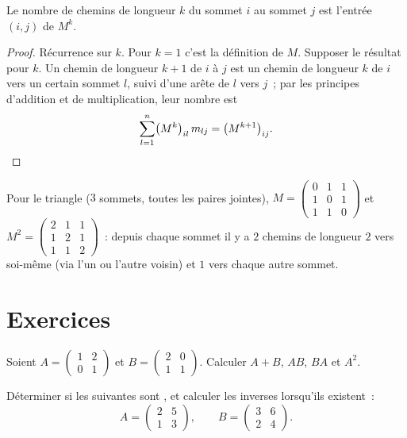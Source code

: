 \begin{theorem}\label{thm:g12:matrix:walks}
Le nombre de chemins de longueur $k$ du sommet $i$ au sommet $j$ est
l'entrée $(i,j)$ de $M^k$.
\end{theorem}

\begin{proof}
Récurrence sur $k$. Pour $k = 1$ c'est la définition de $M$. Supposer le
résultat pour $k$. Un chemin de longueur $k+1$ de $i$ à $j$ est un chemin
de longueur $k$ de $i$ vers un certain sommet $l$, suivi d'une arête de $l$
vers $j$~; par les principes d'addition et de multiplication, leur nombre
est
\[
\sum_{l=1}^{n} \bigl(M^k\bigr)_{il}\, m_{lj} = \bigl(M^{k+1}\bigr)_{ij}.
\qedhere
\]
\end{proof}

\begin{example}
Pour le  triangle ($3$ sommets, toutes les paires jointes),
$M = \begin{pmatrix} 0&1&1\\ 1&0&1\\ 1&1&0\end{pmatrix}$ et
$M^2 = \begin{pmatrix} 2&1&1\\ 1&2&1\\ 1&1&2\end{pmatrix}$~: depuis chaque
sommet il y a $2$ chemins de longueur $2$ vers soi-même (via l'un ou l'autre
voisin) et $1$ vers chaque autre sommet.
\end{example}

\section{Exercices}

\begin{exercise}[$\star$]\label{exo:g12:matrix:1}
Soient $A = \begin{pmatrix} 1 & 2\\ 0 & 1 \end{pmatrix}$ et
$B = \begin{pmatrix} 2 & 0\\ 1 & 1 \end{pmatrix}$. Calculer $A + B$, $AB$,
$BA$ et $A^2$.
\end{exercise}

\begin{exercise}[$\star$]\label{exo:g12:matrix:2}
Déterminer si les  suivantes sont , et calculer les
inverses lorsqu'ils existent~:
\[
A = \begin{pmatrix} 2 & 5\\ 1 & 3\end{pmatrix}, \qquad
B = \begin{pmatrix} 3 & 6\\ 2 & 4\end{pmatrix}.
\]
\end{exercise}

